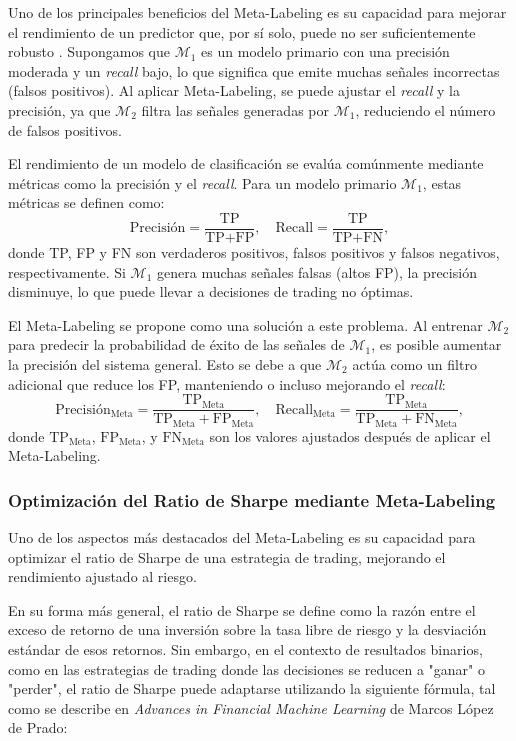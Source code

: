 \documentclass[a4paper,12pt, twoside]{report}
\begin{document}
Uno de los principales beneficios del Meta-Labeling es su capacidad para mejorar 
el rendimiento de un predictor que, por sí solo, puede no ser suficientemente 
robusto \cite{does_meta_labeling_add}. Supongamos que $\mathcal{M}_1$ es un modelo 
primario con una precisión moderada y un \textit{recall} bajo, lo que significa que 
emite muchas señales incorrectas (falsos positivos). Al aplicar Meta-Labeling, se 
puede ajustar el \textit{recall} y la precisión, ya que $\mathcal{M}_2$ filtra las 
señales generadas por $\mathcal{M}_1$, reduciendo el número de falsos positivos.

El rendimiento de un modelo de clasificación se evalúa comúnmente mediante métricas 
como la precisión y el \textit{recall}. Para un modelo primario $\mathcal{M}_1$, 
estas métricas se definen como:
\[
\text{Precisión} = \frac{\text{TP}}{\text{TP} + \text{FP}}, \quad \text{Recall} = \frac{\text{TP}}{\text{TP} + \text{FN}},
\]
donde TP, FP y FN son verdaderos positivos, falsos positivos y falsos negativos, 
respectivamente. Si $\mathcal{M}_1$ genera muchas señales falsas (altos FP), 
la precisión disminuye, lo que puede llevar a decisiones de trading no óptimas.

El Meta-Labeling se propone como una solución a este problema. Al entrenar 
$\mathcal{M}_2$ para predecir la probabilidad de éxito de las señales de 
$\mathcal{M}_1$, es posible aumentar la precisión del sistema general. Esto 
se debe a que $\mathcal{M}_2$ actúa como un filtro adicional que reduce los 
FP, manteniendo o incluso mejorando el \textit{recall}:
\[
\text{Precisión}_{\text{Meta}} = \frac{\text{TP}_{\text{Meta}}}{\text{TP}_{\text{Meta}} + \text{FP}_{\text{Meta}}}, \quad \text{Recall}_{\text{Meta}} = \frac{\text{TP}_{\text{Meta}}}{\text{TP}_{\text{Meta}} + \text{FN}_{\text{Meta}}},
\]
donde $\text{TP}_{\text{Meta}}$, $\text{FP}_{\text{Meta}}$, y $\text{FN}_{\text{Meta}}$ 
son los valores ajustados después de aplicar el Meta-Labeling.


\subsubsection{Optimización del Ratio de Sharpe mediante Meta-Labeling}

Uno de los aspectos más destacados del Meta-Labeling es su capacidad para optimizar el 
ratio de Sharpe de una estrategia de trading, mejorando el rendimiento ajustado al riesgo. 


En su forma más general, el ratio de Sharpe se define como la razón entre el exceso 
de retorno de una inversión sobre la tasa libre de riesgo y la desviación estándar 
de esos retornos. Sin embargo, en el contexto de resultados binarios, como en las 
estrategias de trading donde las decisiones se reducen a "ganar" o "perder", el ratio 
de Sharpe puede adaptarse utilizando la siguiente fórmula, tal como se describe en 
\textit{Advances in Financial Machine Learning} 
de Marcos López de Prado:
\end{document}
